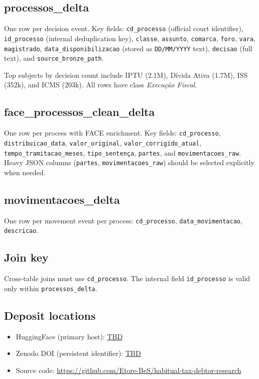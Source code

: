 \documentclass[11pt,a4paper]{article}
\begin{document}
\subsection*{processos\_delta}

One row per decision event. Key fields: \texttt{cd\_processo} (official court identifier), \texttt{id\_processo} (internal deduplication key), \texttt{classe}, \texttt{assunto}, \texttt{comarca}, \texttt{foro}, \texttt{vara}, \texttt{magistrado}, \texttt{data\_disponibilizacao} (stored as \texttt{DD/MM/YYYY} text), \texttt{decisao} (full text), and \texttt{source\_bronze\_path}.

Top subjects by decision count include IPTU (2.1M), D\'ivida Ativa (1.7M), ISS (352k), and ICMS (203k). All rows have class \emph{Execu\c{c}\~ao Fiscal}.

\subsection*{face\_processos\_clean\_delta}

One row per process with FACE enrichment. Key fields: \texttt{cd\_processo}, \texttt{distribuicao\_data}, \texttt{valor\_original}, \texttt{valor\_corrigido\_atual}, \texttt{tempo\_tramitacao\_meses}, \texttt{tipo\_senten\c{c}a}, \texttt{partes}, and \texttt{movimentacoes\_raw}. Heavy JSON columns (\texttt{partes}, \texttt{movimentacoes\_raw}) should be selected explicitly when needed.

\subsection*{movimentacoes\_delta}

One row per movement event per process: \texttt{cd\_processo}, \texttt{data\_movimentacao}, \texttt{descricao}.

\subsection*{Join key}

Cross-table joins must use \texttt{cd\_processo}. The internal field \texttt{id\_processo} is valid only within \texttt{processos\_delta}.

\subsection*{Deposit locations}

\begin{itemize}
  \item HuggingFace (primary host): \url{TBD}
  \item Zenodo DOI (persistent identifier): \url{TBD}
  \item Source code: \url{https://github.com/Etore-BeS/habitual-tax-debtor-research}
\end{itemize}
\end{document}

